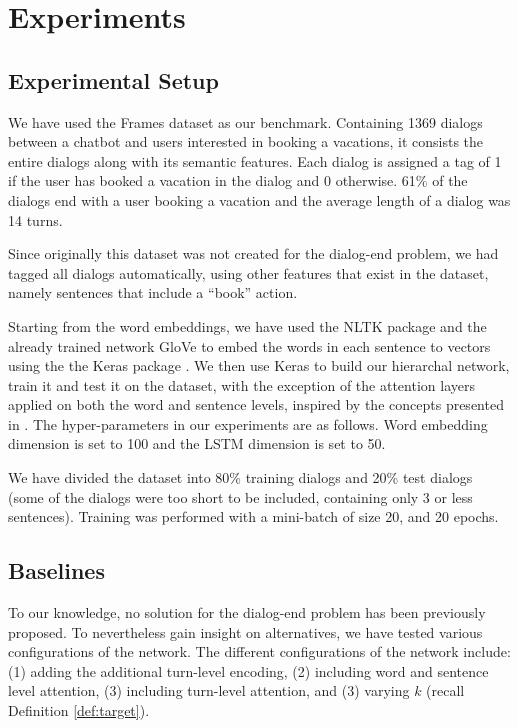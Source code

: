 \section{Experiments}\label{sec:exp}

\subsection{Experimental Setup}
We have used the Frames dataset \cite{frames} as 
our benchmark. Containing 1369 dialogs between 
a chatbot and users interested in booking a vacations, 
it consists the entire dialogs along with its semantic features. 
Each dialog is assigned a tag of 1 if the user has booked a vacation 
in the dialog and 0 otherwise. 61\% of the dialogs end with a user 
booking a vacation and the average length of a dialog was 14 turns. 

Since originally this dataset was not created for the dialog-end problem, 
we had tagged all dialogs automatically, using other features that exist 
in the dataset, namely sentences that include a ``book'' action. 

Starting from the word embeddings, we have used the 
NLTK package \cite{DBLP:conf/acl/Bird06} and the already trained network GloVe \cite{glove} 
to embed the words in each sentence to vectors using the the Keras package \cite{chollet2015}. 
We then use Keras to build our hierarchal network, train it and test it on the 
dataset, with the exception of the attention layers applied on both the word and sentence 
levels, inspired by the concepts presented in \cite{attention}. 
The hyper-parameters in our experiments are as follows. 
Word embedding dimension is set to 100 and the 
LSTM dimension is set to 50. 

We have divided the dataset into 80\% training dialogs and 20\% test dialogs 
(some of the dialogs were too short to be included, containing only 3 or less sentences).
Training was performed with a mini-batch of size 20, 
and 20 epochs.

\subsection{Baselines}%
To our knowledge, no solution for the 
dialog-end problem has been previously proposed. To nevertheless
gain insight on alternatives, we have tested various configurations 
of the network. 
The different configurations of the network include: 
(1) adding the additional turn-level encoding, 
(2) including word and sentence level attention, 
(3) including turn-level attention, and 
(3) varying $k$ (recall Definition \ref{def:target}).


